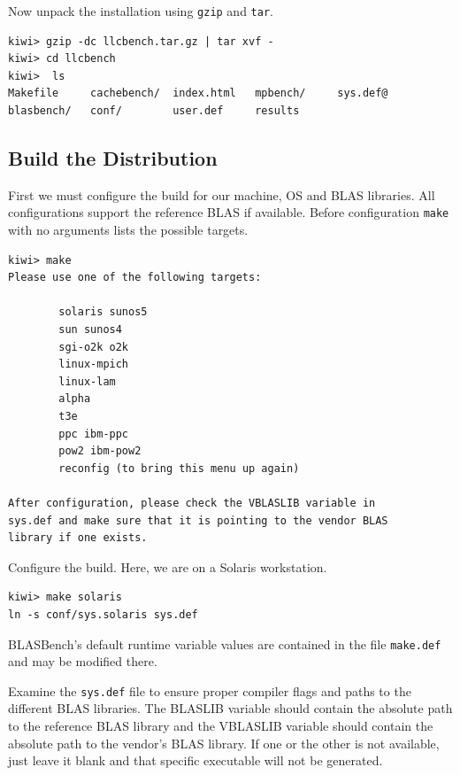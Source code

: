 \documentclass [12pt]{article}
\begin{document}
Now unpack the installation using {\tt gzip} and {\tt tar}.

\begin{verbatim}
kiwi> gzip -dc llcbench.tar.gz | tar xvf -
kiwi> cd llcbench
kiwi>  ls
Makefile     cachebench/  index.html   mpbench/     sys.def@
blasbench/   conf/        user.def     results

\end{verbatim}

\subsection{Build the Distribution}

First we must configure the build for our machine, OS and BLAS libraries. All
configurations support the reference BLAS if available. Before configuration 
{\tt make} with no arguments lists the possible targets.

\begin{verbatim}
kiwi> make
Please use one of the following targets:

        solaris sunos5
        sun sunos4
        sgi-o2k o2k
        linux-mpich
        linux-lam
        alpha
        t3e
        ppc ibm-ppc
        pow2 ibm-pow2
        reconfig (to bring this menu up again)

After configuration, please check the VBLASLIB variable in 
sys.def and make sure that it is pointing to the vendor BLAS
library if one exists.

\end{verbatim}

Configure the build. Here, we are on a Solaris workstation.

\begin{verbatim}
kiwi> make solaris
ln -s conf/sys.solaris sys.def

\end{verbatim}

BLASBench's default runtime variable values are contained in the file {\tt make.def} and may
be modified there.

Examine the {\tt sys.def} file to ensure proper compiler flags and paths to
the different BLAS libraries.  The BLASLIB variable should contain the
absolute path to the reference BLAS library and the VBLASLIB variable
should contain the absolute path to the vendor's BLAS library. If one
or the other is not available, just leave it blank and that specific
executable will not be generated. \\
\end{document}
